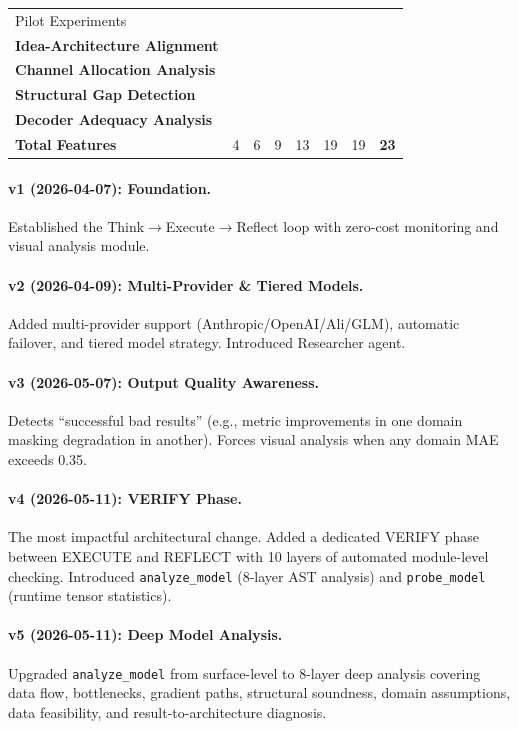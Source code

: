 \documentclass[11pt,a4paper]{article}
\newcommand{\toolname}[1]{\texttt{#1}}
\newcommand{\cmark}{\textcolor{green!60!black}{\checkmark}}
\begin{document}
\begin{table}[t]
\begin{threeparttable}
\begin{tabularx}{\linewidth}{X ccccccc}
Pilot Experiments & & & & & \cmark & \cmark & \cmark \\
\textbf{Idea-Architecture Alignment} & & & & & & & \cmark \\
\textbf{Channel Allocation Analysis} & & & & & & & \cmark \\
\textbf{Structural Gap Detection} & & & & & & & \cmark \\
\textbf{Decoder Adequacy Analysis} & & & & & & & \cmark \\
\midrule
\textbf{Total Features} & 4 & 6 & 9 & 13 & 19 & 19 & \textbf{23} \\
\bottomrule
\end{tabularx}
\end{threeparttable}
\end{table}

\paragraph{v1 (2026-04-07): Foundation.}
Established the Think$\to$Execute$\to$Reflect loop with zero-cost monitoring and visual analysis module.

\paragraph{v2 (2026-04-09): Multi-Provider \& Tiered Models.}
Added multi-provider support (Anthropic/OpenAI/Ali/GLM), automatic failover, and tiered model strategy. Introduced Researcher agent.

\paragraph{v3 (2026-05-07): Output Quality Awareness.}
Detects ``successful bad results'' (e.g., metric improvements in one domain masking degradation in another). Forces visual analysis when any domain MAE exceeds 0.35.

\paragraph{v4 (2026-05-11): VERIFY Phase.}
The most impactful architectural change. Added a dedicated VERIFY phase between EXECUTE and REFLECT with 10 layers of automated module-level checking. Introduced \toolname{analyze\_model} (8-layer AST analysis) and \toolname{probe\_model} (runtime tensor statistics).

\paragraph{v5 (2026-05-11): Deep Model Analysis.}
Upgraded \toolname{analyze\_model} from surface-level to 8-layer deep analysis covering data flow, bottlenecks, gradient paths, structural soundness, domain assumptions, data feasibility, and result-to-architecture diagnosis.
\end{document}
